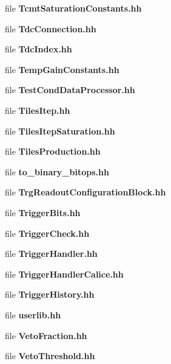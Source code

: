 \begin{DoxyCompactItemize}
file {\bfseries TcmtSaturationConstants.hh}
\item 
file {\bfseries TdcConnection.hh}
\item 
file {\bfseries TdcIndex.hh}
\item 
file {\bfseries TempGainConstants.hh}
\item 
file {\bfseries TestCondDataProcessor.hh}
\item 
file {\bfseries TilesItep.hh}
\item 
file {\bfseries TilesItepSaturation.hh}
\item 
file {\bfseries TilesProduction.hh}
\item 
file {\bfseries to\_\-binary\_\-bitops.hh}
\item 
file {\bfseries TrgReadoutConfigurationBlock.hh}
\item 
file {\bfseries TriggerBits.hh}
\item 
file {\bfseries TriggerCheck.hh}
\item 
file {\bfseries TriggerHandler.hh}
\item 
file {\bfseries TriggerHandlerCalice.hh}
\item 
file {\bfseries TriggerHistory.hh}
\item 
file {\bfseries userlib.hh}
\item 
file {\bfseries VetoFraction.hh}
\item 
file {\bfseries VetoThreshold.hh}
\end{DoxyCompactItemize}
